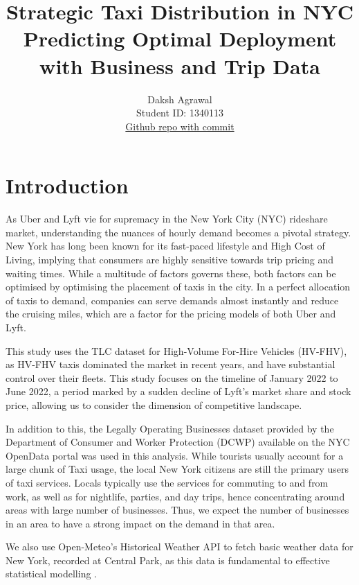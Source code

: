\documentclass[11pt]{article}
\title{\textbf{Strategic Taxi Distribution in NYC} \\ Predicting Optimal Deployment with Business and Trip Data}
\author{
Daksh Agrawal \\
Student ID: 1340113 \\
\href{https://github.com/MAST30034-AppliedDataScience/project-1-individual-dakshAg}{Github repo with commit}
}
\begin{document}
\maketitle

\section{Introduction}

As Uber and Lyft vie for supremacy in the New York City (NYC) rideshare market, understanding the nuances of hourly demand becomes a pivotal strategy\cite{2022sensorreading}. New York has long been known for its fast-paced lifestyle and High Cost of Living, implying that consumers are highly sensitive towards trip pricing and waiting times. While a multitude of factors governs these, both factors can be optimised by optimising the placement of taxis in the city\cite{2022sensorreading}. In a perfect allocation of taxis to demand, companies can serve demands almost instantly and reduce the cruising miles, which are a factor for the pricing models of both Uber and Lyft\cite{uberpricing, lyftpricing}.

This study uses the TLC dataset for High-Volume For-Hire Vehicles (HV-FHV), as HV-FHV taxis dominated the market in recent years, and have substantial control over their fleets\cite{tlchomepage}. This study focuses on the timeline of January 2022 to June 2022, a period marked by a sudden decline of Lyft’s market share and stock price, allowing us to consider the dimension of competitive landscape\cite{lyftfall}.

In addition to this, the Legally Operating Businesses dataset provided by the Department of Consumer and Worker Protection (DCWP) available on the NYC OpenData portal was used in this analysis\cite{lobhomepage}. While tourists usually account for a large chunk of Taxi usage, the local New York citizens are still the primary users of taxi services\cite{communingpdf}. Locals typically use the services for commuting to and from work, as well as for nightlife, parties, and day trips, hence concentrating around areas with large number of businesses. Thus, we expect the number of businesses in an area to have a strong impact on the demand in that area.

We also use Open-Meteo's Historical Weather API to fetch basic weather data for New York, recorded at Central Park, as this data is fundamental to effective statistical modelling \cite{weather}.
\end{document}
